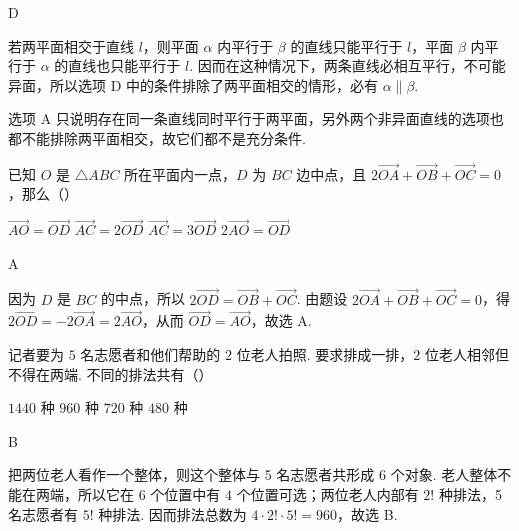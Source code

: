 \begin{answer}
D
\end{answer}

\begin{solution}
若两平面相交于直线 \(l\)，则平面 \(\alpha\) 内平行于 \(\beta\) 的直线只能平行于 \(l\)，平面 \(\beta\) 内平行于 \(\alpha\) 的直线也只能平行于 \(l\). 因而在这种情况下，两条直线必相互平行，不可能异面，所以选项 D 中的条件排除了两平面相交的情形，必有 \(\alpha\parallel\beta\).

选项 A 只说明存在同一条直线同时平行于两平面，另外两个非异面直线的选项也都不能排除两平面相交，故它们都不是充分条件.
\end{solution}

\begin{problem}
已知 \(O\) 是 \(\triangle ABC\) 所在平面内一点，\(D\) 为 \(BC\) 边中点，且 \(2\overrightarrow{OA} + \overrightarrow{OB} + \overrightarrow{OC} = 0\)，那么（\quad）

\choices
    {\(\overrightarrow{AO} = \overrightarrow{OD}\)}
    {\(\overrightarrow{AC} = 2\overrightarrow{OD}\)}
    {\(\overrightarrow{AC} = 3\overrightarrow{OD}\)}
    {\(2\overrightarrow{AO} = \overrightarrow{OD}\)}
\end{problem}

\begin{answer}
A
\end{answer}

\begin{solution}
因为 \(D\) 是 \(BC\) 的中点，所以
\(2\overrightarrow{OD}=\overrightarrow{OB}+\overrightarrow{OC}\).
由题设 \(2\overrightarrow{OA}+\overrightarrow{OB}+\overrightarrow{OC}=0\)，得
\(2\overrightarrow{OD}=-2\overrightarrow{OA}=2\overrightarrow{AO}\)，从而
\(\overrightarrow{OD}=\overrightarrow{AO}\)，故选 A.
\end{solution}

\begin{problem}
记者要为 \(5\) 名志愿者和他们帮助的 \(2\) 位老人拍照. 要求排成一排，\(2\) 位老人相邻但不得在两端. 不同的排法共有（\quad）

\choices
    {\(1440\) 种}
    {\(960\) 种}
    {\(720\) 种}
    {\(480\) 种}
\end{problem}

\begin{answer}
B
\end{answer}

\begin{solution}
把两位老人看作一个整体，则这个整体与 5 名志愿者共形成 6 个对象. 老人整体不能在两端，所以它在 6 个位置中有 \(4\) 个位置可选；两位老人内部有 \(2!\) 种排法，5 名志愿者有 \(5!\) 种排法. 因而排法总数为
\(4\cdot2!\cdot5!=960\)，故选 B.
\end{solution}

